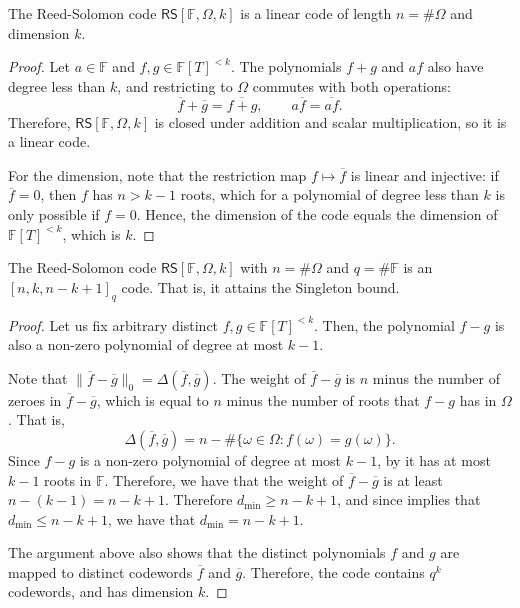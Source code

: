 \documentclass[../../book]{subfiles}
\begin{document}
\begin{proposition}\label{prop:rs-linear}
    The Reed-Solomon code $\mathsf{RS}[\mathbb{F}, \Omega, k]$ is a linear code of length $n = \#\Omega$ and dimension $k$.
\end{proposition}

\begin{proof}
    Let $a \in \mathbb{F}$ and $f, g \in \mathbb{F}[T]^{<k}$.
    The polynomials $f + g$ and $af$ also have degree less than $k$, and restricting to $\Omega$ commutes with both operations:
    \begin{equation*}
        \overline{f} + \overline{g} = \overline{f + g}, \qquad a \overline{f} = \overline{af}.
    \end{equation*}
    Therefore, $\mathsf{RS}[\mathbb{F}, \Omega, k]$ is closed under addition and scalar multiplication, so it is a linear code.

    For the dimension, note that the restriction map $f \mapsto \overline{f}$ is linear and injective: if $\overline{f} = 0$, then $f$ has $n > k - 1$ roots, which for a polynomial of degree less than $k$ is only possible if $f = 0$.
    Hence, the dimension of the code equals the dimension of $\mathbb{F}[T]^{<k}$, which is $k$.
\end{proof}

\begin{proposition}\label{prop:rs-distance}
  The Reed-Solomon code $\mathsf{RS}[\mathbb{F}, \Omega, k]$ with $n = \#\Omega$ and $q = \#\mathbb{F}$ is an $[n,k,n-k+1]_q$ code. That is, it attains the Singleton bound.
\end{proposition}
\begin{proof}
  Let us fix arbitrary distinct $f, g \in \mathbb{F}[T]^{<k}$. Then, the polynomial $f - g$ is also a non-zero polynomial of degree at most $k-1$.

  Note that $\|\overline{f} - \overline{g}\|_0 = \Delta(\overline{f}, \overline{g})$. The weight of $\overline{f} - \overline{g}$ is $n$ minus the number of zeroes in $\overline{f} - \overline{g}$, which is equal to $n$ minus the number of roots that $f - g$ has in $\Omega$. That is,
  \begin{equation*}
    \Delta(\overline{f}, \overline{g}) = n - \#\{\omega \in \Omega : f(\omega) = g(\omega)\}.
  \end{equation*}
  Since $f - g$ is a non-zero polynomial of degree at most $k-1$, by  it has at most $k-1$ roots in $\mathbb{F}$.
  Therefore, we have that the weight of $\overline{f} - \overline{g}$ is at least $n-(k-1)=n-k+1$. Therefore $d_{\min} \geq n-k+1$, and since  implies that $d_{\min} \leq n-k+1$, we have that $d_{\min} = n-k+1$.

  The argument above also shows that the distinct polynomials $f$ and $g$ are mapped to distinct codewords $\overline{f}$ and $\overline{g}$. Therefore, the code contains $q^k$ codewords, and has dimension $k$.
\end{proof}
\end{document}
